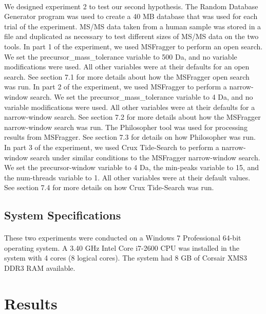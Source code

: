 \documentclass [11pt] {article}
\begin{document}
	\paragraph {}
	\qquad We designed experiment 2 to test our second hypothesis.  The Random Database Generator program was used to create a 40 MB database that was used for each trial of the experiment.  MS/MS data taken from a human sample was stored in a file and duplicated as necessary to test different sizes of MS/MS data on the two tools.  In part 1 of the experiment, we used MSFragger to perform an open search.  We set the precursor\_mass\_tolerance variable to 500 Da, and no variable modifications were used.  All other variables were at their defaults for an open search.  See section 7.1 for more details about how the MSFragger open search was run.  In part 2 of the experiment, we used MSFragger to perform a narrow-window search.  We set the precursor\_mass\_tolerance variable to 4 Da, and no variable modifications were used.  All other variables were at their defaults for a narrow-window search.  See section 7.2 for more details about how the MSFragger narrow-window search was run.  The Philosopher tool was used for processing results from MSFragger.  See section 7.3 for details on how Philosopher was run.  In part 3 of the experiment, we used Crux Tide-Search to perform a narrow-window search under similar conditions to the MSFragger narrow-window search.  We set the precursor-window variable to 4 Da, the min-peaks variable to 15, and the num-threads variable to 1.  All other variables were at their default values.  See section 7.4 for more details on how Crux Tide-Search was run.
	
	\subsection {System Specifications}
	\paragraph {}
	
	\qquad These two experiments were conducted on a Windows 7 Professional 64-bit operating system.  A 3.40 GHz Intel Core i7-2600 CPU was installed in the system with 4 cores (8 logical cores).  The system had 8 GB of Corsair XMS3 DDR3 RAM available.
	
	\section {Results}
\end{document}
